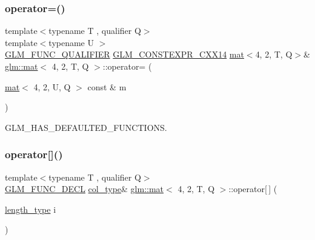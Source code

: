 \subsubsection{\texorpdfstring{operator=()}{operator=()}\hspace{0.1cm}{\footnotesize\ttfamily [3/3]}}
{\footnotesize\ttfamily template$<$typename T , qualifier Q$>$ \\
template$<$typename U $>$ \\
\hyperlink{setup_8hpp_a33fdea6f91c5f834105f7415e2a64407}{G\+L\+M\+\_\+\+F\+U\+N\+C\+\_\+\+Q\+U\+A\+L\+I\+F\+I\+ER} \hyperlink{setup_8hpp_a4dd12abf5e1164bc57f3a34671d03844}{G\+L\+M\+\_\+\+C\+O\+N\+S\+T\+E\+X\+P\+R\+\_\+\+C\+X\+X14} \hyperlink{structglm_1_1mat}{mat}$<$4, 2, T, Q$>$\& \hyperlink{structglm_1_1mat}{glm\+::mat}$<$ 4, 2, T, Q $>$\+::operator= (\begin{DoxyParamCaption}\item[{\hyperlink{structglm_1_1mat}{mat}$<$ 4, 2, U, Q $>$ const \&}]{m }\end{DoxyParamCaption})}



G\+L\+M\+\_\+\+H\+A\+S\+\_\+\+D\+E\+F\+A\+U\+L\+T\+E\+D\+\_\+\+F\+U\+N\+C\+T\+I\+O\+NS. 

\mbox{\label{structglm_1_1mat_3_014_00_012_00_01_t_00_01_q_01_4_ac3817abff98f5328dd58c18536a6a368}} 
\subsubsection{\texorpdfstring{operator[]()}{operator[]()}\hspace{0.1cm}{\footnotesize\ttfamily [1/2]}}
{\footnotesize\ttfamily template$<$typename T , qualifier Q$>$ \\
\hyperlink{setup_8hpp_ab2d052de21a70539923e9bcbf6e83a51}{G\+L\+M\+\_\+\+F\+U\+N\+C\+\_\+\+D\+E\+CL} \hyperlink{structglm_1_1mat_3_014_00_012_00_01_t_00_01_q_01_4_a60138ab077eb3bef96e654e672af5059}{col\+\_\+type}\& \hyperlink{structglm_1_1mat}{glm\+::mat}$<$ 4, 2, T, Q $>$\+::operator\mbox{[}$\,$\mbox{]} (\begin{DoxyParamCaption}\item[{\hyperlink{structglm_1_1mat_3_014_00_012_00_01_t_00_01_q_01_4_a4b192a2630331f70ca61657d9783026e}{length\+\_\+type}}]{i }\end{DoxyParamCaption})}

